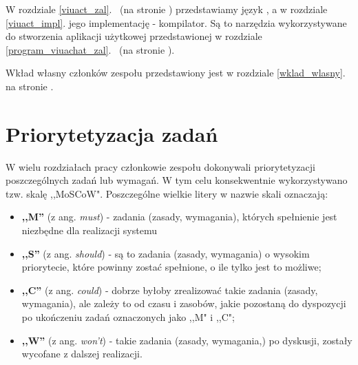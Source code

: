 W rozdziale \ref{viuact_zal}.~ (na stronie \pageref{viuact_zal}) przedstawiamy język
\ViuAct, a w rozdziale \ref{viuact_impl}. jego implementację - kompilator. Są to narzędzia wykorzystywane do
stworzenia aplikacji użytkowej przedstawionej w rozdziale
\ref{program_viuachat_zal}.~ (na stronie \pageref{program_viuachat_zal}).

Wkład własny członków zespołu przedstawiony jest w rozdziale \ref{wklad_wlasny}. na stronie
\pageref{wklad_wlasny}.

\section{Priorytetyzacja zadań}
W wielu rozdziałach pracy członkowie zespołu dokonywali priorytetyzacji
poszczególnych zadań lub wymagań. W tym celu konsekwentnie wykorzystywano tzw.
skalę ,,MoSCoW". Poszczególne wielkie litery w nazwie skali oznaczają:

\begin{itemize}
	\item \textbf{,,M''} (z ang. \textit{must}) - zadania (zasady,
  wymagania), których spełnienie jest niezbędne dla realizacji systemu
	\item \textbf{,,S''} (z ang. \textit{should}) - są to zadania
  (zasady, wymagania) o wysokim priorytecie, które powinny
	zostać spełnione, o ile tylko jest to możliwe;
	\item \textbf{,,C''} (z ang. \textit{could}) - dobrze byłoby zrealizować takie zadania (zasady, wymagania), ale zależy to od czasu
	i zasobów, jakie pozostaną do dyspozycji po ukończeniu zadań oznaczonych jako ,,M" i ,,C";
	\item \textbf{,,W''} (z ang. \textit{won't}) - takie zadania (zasady, wymagania,) po dyskusji, zostały wycofane z dalszej realizacji.
\end{itemize}


